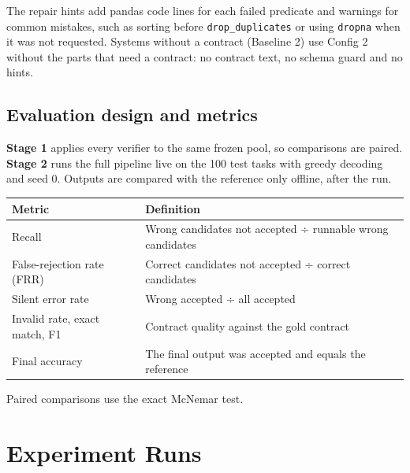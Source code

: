 \documentclass[11pt]{article}
\begin{document}
The repair hints add pandas code lines for each failed predicate and
warnings for common mistakes, such as sorting before
\texttt{drop\_\allowbreak{}duplicates} or using \texttt{dropna} when it
was not requested. Systems without a contract (Baseline 2) use Config 2
without the parts that need a contract: no contract text, no schema
guard and no hints.

\subsection{Evaluation design and metrics}

\textbf{Stage 1} applies every verifier to the same frozen pool, so
comparisons are paired. \textbf{Stage 2} runs the full pipeline live on
the 100 test tasks with greedy decoding and seed 0. Outputs are compared
with the reference only offline, after the run.

\begin{table}[!tp]
\centering\footnotesize\setlength{\tabcolsep}{3pt}\renewcommand{\arraystretch}{1.1}
\begin{tabularx}{\textwidth}{l>{\raggedright\arraybackslash}X}
\toprule
\textbf{Metric} & \textbf{Definition} \\
\midrule
Recall & Wrong candidates not accepted ÷ runnable wrong candidates \\
False-rejection rate (FRR) & Correct candidates not accepted ÷ correct candidates \\
Silent error rate & Wrong accepted ÷ all accepted \\
Invalid rate, exact match, F1 & Contract quality against the gold contract \\
Final accuracy & The final output was accepted and equals the reference \\
\bottomrule
\end{tabularx}
\end{table}

Paired comparisons use the exact McNemar test.

\section{Experiment Runs}
\end{document}
